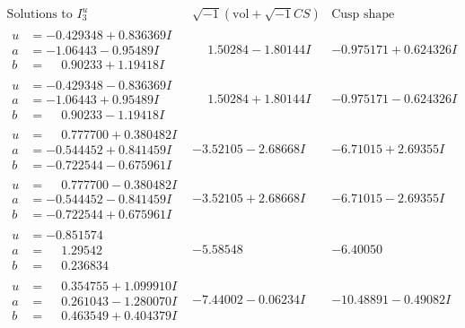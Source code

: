 \documentclass[1p]{elsarticle_modified}
\theoremstyle{definition}
\newcommand{\I}{\sqrt{-1}}
\begin{document}
$$\begin{array}{c|c|c}  
\text{Solutions to }I^u_{3}& \I (\text{vol} + \sqrt{-1}CS) & \text{Cusp shape}\\
 \hline 
\begin{aligned}
u &= -0.429348 + 0.836369 I \\
a &= -1.06443 - 0.95489 I \\
b &= \phantom{-}0.90233 + 1.19418 I\end{aligned}
 & \phantom{-}1.50284 - 1.80144 I & -0.975171 + 0.624326 I \\ \hline\begin{aligned}
u &= -0.429348 - 0.836369 I \\
a &= -1.06443 + 0.95489 I \\
b &= \phantom{-}0.90233 - 1.19418 I\end{aligned}
 & \phantom{-}1.50284 + 1.80144 I & -0.975171 - 0.624326 I \\ \hline\begin{aligned}
u &= \phantom{-}0.777700 + 0.380482 I \\
a &= -0.544452 + 0.841459 I \\
b &= -0.722544 - 0.675961 I\end{aligned}
 & -3.52105 - 2.68668 I & -6.71015 + 2.69355 I \\ \hline\begin{aligned}
u &= \phantom{-}0.777700 - 0.380482 I \\
a &= -0.544452 - 0.841459 I \\
b &= -0.722544 + 0.675961 I\end{aligned}
 & -3.52105 + 2.68668 I & -6.71015 - 2.69355 I \\ \hline\begin{aligned}
u &= -0.851574\phantom{ +0.000000I} \\
a &= \phantom{-}1.29542\phantom{ +0.000000I} \\
b &= \phantom{-}0.236834\phantom{ +0.000000I}\end{aligned}
 & -5.58548\phantom{ +0.000000I} & -6.40050\phantom{ +0.000000I} \\ \hline\begin{aligned}
u &= \phantom{-}0.354755 + 1.099910 I \\
a &= \phantom{-}0.261043 - 1.280070 I \\
b &= \phantom{-}0.463549 + 0.404379 I\end{aligned}
 & -7.44002 - 0.06234 I & -10.48891 - 0.49082 I \\ \hline\begin{aligned}

\end{aligned}
\end{array}$$
\end{document}
